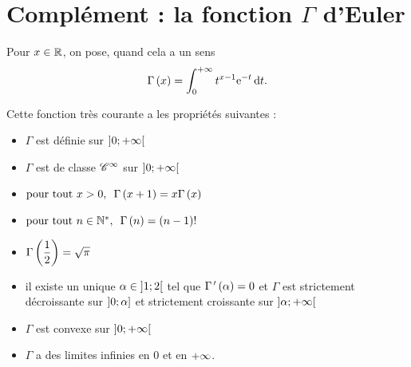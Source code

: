 \section{Complément : la fonction \(\Gamma\) d'Euler}

Pour \(x\in\mathbb{R}\), on pose, quand cela a un sens \[\Gamma\paren{x}=\int_0^{\pinf}t^{x-1}\e{-t}\odif{t}.\]

Cette fonction très courante a les propriétés suivantes :

\begin{itemize}
    \item \(\Gamma\) est définie sur \(\left]0;+\infty\right[\) \\
    \item \(\Gamma\) est de classe \(\mathscr{C}^{\infty}\) sur \(\left]0;+\infty\right[\) \\
    \item \(\quantifs{\tpt x>0}\Gamma\paren{x+1}=x\Gamma\paren{x}\) \\
    \item \(\quantifs{\tpt n\in\Ns}\Gamma\paren{n}=\paren{n-1}!\) \\
    \item \(\Gamma\left(\dfrac{1}{2}\right)=\sqrt{\pi}\) \\
    \item il existe un unique \(\alpha\in\left]1;2\right[\) tel que \(\Gamma^{\,\prime}\left(\alpha\right)=0\) et \(\Gamma\) est strictement décroissante sur \(\left]0;\alpha\right]\) et strictement croissante sur \(\left]\alpha;+\infty\right[\) \\
    \item \(\Gamma\) est convexe sur \(\left]0;+\infty\right[\) \\
    \item \(\Gamma\) a des limites infinies en \(0\) et en \(+\infty\).
\end{itemize}

